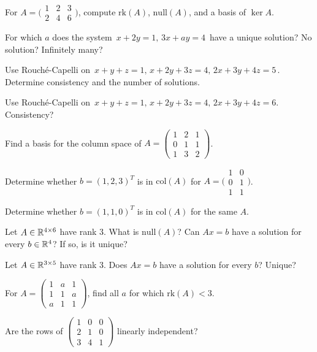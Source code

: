 \begin{problems}
    \item For $A = \bigl(\begin{smallmatrix} 1 & 2 & 3 \\ 2 & 4 & 6 \end{smallmatrix}\bigr)$, compute $\mathrm{rk}(A)$, $\mathrm{null}(A)$, and a basis of $\ker A$.
    \item For which $a$ does the system $\,x + 2 y = 1,\, 3 x + a y = 4\,$ have a unique solution? No solution? Infinitely many?
    \item Use Rouché-Capelli on $\,x + y + z = 1,\, x + 2 y + 3 z = 4,\, 2 x + 3 y + 4 z = 5\,$. Determine consistency and the number of solutions.
    \item Use Rouché-Capelli on $\,x + y + z = 1,\, x + 2 y + 3 z = 4,\, 2 x + 3 y + 4 z = 6$. Consistency?
    \item Find a basis for the column space of $A = \begin{pmatrix} 1 & 2 & 1 \\ 0 & 1 & 1 \\ 1 & 3 & 2 \end{pmatrix}$.
    \item Determine whether $b = (1, 2, 3)^{T}$ is in $\mathrm{col}(A)$ for $A = \bigl(\begin{smallmatrix} 1 & 0 \\ 0 & 1 \\ 1 & 1 \end{smallmatrix}\bigr)$.
    \item Determine whether $b = (1, 1, 0)^{T}$ is in $\mathrm{col}(A)$ for the same $A$.
    \item Let $A \in \mathbb{R}^{4 \times 6}$ have rank $3$. What is $\mathrm{null}(A)$? Can $A x = b$ have a solution for every $b \in \mathbb{R}^{4}$? If so, is it unique?
    \item Let $A \in \mathbb{R}^{3 \times 5}$ have rank $3$. Does $A x = b$ have a solution for every $b$? Unique?
    \item For $A = \begin{pmatrix} 1 & a & 1 \\ 1 & 1 & a \\ a & 1 & 1 \end{pmatrix}$, find all $a$ for which $\mathrm{rk}(A) < 3$.
    \item Are the rows of $\begin{pmatrix} 1 & 0 & 0 \\ 2 & 1 & 0 \\ 3 & 4 & 1 \end{pmatrix}$ linearly independent?

\end{problems}
